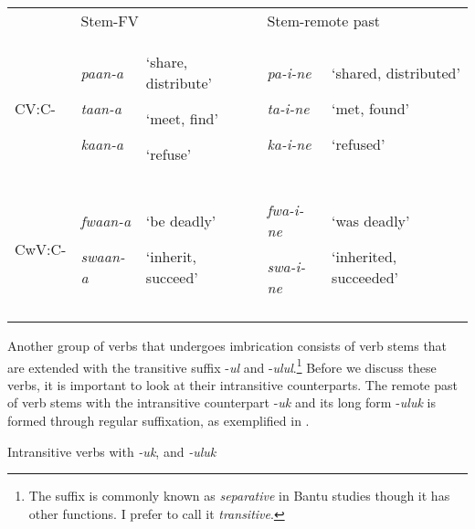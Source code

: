 \documentclass[output=paper]{langsci/langscibook}
\begin{document}
\begin{tabularx}{\textwidth}{XXXXX} & \multicolumn{2}{l}{Stem-FV} & \multicolumn{2}{l}{Stem-remote past}\\
\lsptoprule
CV:C- & {\emph{paan-a}}

{\emph{taan-a}}

\emph{kaan-a} & {‘share, distribute’}

{‘meet, find’}

‘refuse’ & {\emph{pa-i-ne}}

{\emph{ta-i-ne}}

\emph{ka-i-ne} & {‘shared, distributed’}

{‘met, found’}

‘refused’\\
CwV:C- & {\emph{fwaan-a}}

\emph{swaan-a} & {‘be deadly’}

‘inherit, succeed’ & {\emph{fwa-i-ne}}

\emph{swa-i-ne} & {‘was deadly’}

‘inherited, succeeded’\\
\lspbottomrule
\end{tabularx}
Another group of verbs that undergoes imbrication consists of verb stems that are extended with the transitive suffix -\textit{ul }and -\textit{ulul}.\footnote{ The suffix is commonly known as \emph{separative} in Bantu studies though it has other functions. I prefer to call it \emph{transitive}.} Before we discuss these verbs, it is important to look at their intransitive counterparts. The remote past of verb stems with the intransitive counterpart -\textit{uk} and its long form -\textit{uluk} is formed through regular suffixation, as exemplified in .

\begin{table}
\caption{Intransitive verbs with \textit{{}-uk}, and \textit{{}-uluk}}
\label{tab:22}
\end{table}
\end{document}
